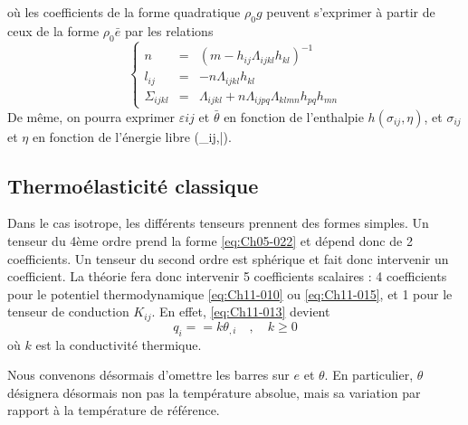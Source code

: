 où les coefficients de la forme quadratique $\rho_0 g$ peuvent s'exprimer à partir de ceux de la forme $\rho_0 \bar{e}$ par les relations 
\begin{equation}
 \left\{
  \begin{aligned}
    n             & = & \left(m - h_{ij} \Lambda_{ijkl} h_{kl}\right)^{-1} \\
    l_{ij}        & = & -n \Lambda_{ijkl} h_{kl} \\
    \Sigma_{ijkl} & = & \Lambda_{ijkl} + n \Lambda_{ijpq}\Lambda_{klmn} h_{pq} h_{mn}
  \end{aligned}
  \right.
    \label{eq:Ch11-016}
\end{equation}
De même, on pourra exprimer $\varepsilon{ij}$ et $\bar{\theta}$ en fonction de l'enthalpie $h(\sigma_{ij},\eta)$, et $\sigma_{ij}$ et $\eta$ en fonction de l'énergie libre \psi(\varepsilon_{ij},\bar{\theta}). 

\subsection{Thermoélasticité classique}\label{ssec:Ch11-1.2} 
Dans le cas isotrope, les différents tenseurs prennent des formes simples. Un tenseur du 4ème ordre prend la forme \eqref{eq:Ch05-022} et dépend donc de 2 coefficients. Un tenseur du second ordre est sphérique et fait donc interve­nir un coefficient. La théorie fera donc intervenir 5 coefficients scalaires : 4 coefficients pour le potentiel thermodynamique \eqref{eq:Ch11-010} ou \eqref{eq:Ch11-015}, et 1 pour le tenseur de conduction $K_{ij}$. En effet, \eqref{eq:Ch11-013} devient
\begin{equation}
    q_i = =k \theta_{,i} \quad , \quad k \geq 0
    \label{eq:Ch11-018}
\end{equation}
où $k$ est la conductivité thermique. 

Nous convenons désormais d'omettre les barres sur $e$ et $\theta$. En par­ticulier, $\theta$ désignera désormais non pas la température absolue, mais sa va­riation par rapport à la température de référence. 

